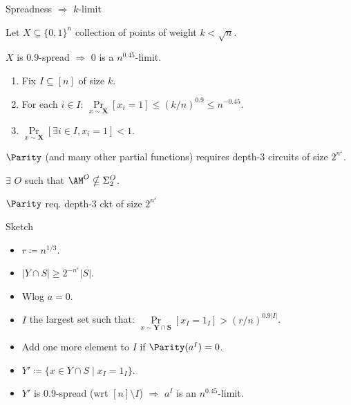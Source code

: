 \begin{frame}{Spreadness $\Rightarrow$ $k$-limit}

    Let $X \subseteq \{0, 1\}^n$ collection of points of weight $k < \sqrt{n}$.
    
    \begin{lemma}    
        $X$ is $0.9$-spread $\Rightarrow$ $0$ is a $n^{0.45}$-limit.
    \end{lemma}

    \pause

    \begin{enumerate}
        \item Fix $I \subseteq [n]$ of size $k$.
        \item For each $i \in I$: $\Pr\limits_{x \sim \mathbf{X}}[x_i = 1] \le \left( k / n \right)^{0.9}
            \le n^{-0.45}$.
            \pause
        \item $\Pr\limits_{x \sim \mathbf{X}}[\exists i \in I, x_i = 1] < 1$.
    \end{enumerate}

    \pause
    \begin{corollary}
        $\Parity$ \alert{(and many other partial functions)} requires depth-$3$ circuits of size $2^{n^{\varepsilon}}$.
    \end{corollary}

    \pause
    \begin{corollary}[Santha 89]
        \alert{$\exists$} $O$ such that $\AM^{O} \nsubseteq \Sigma_2^{O}$.
    \end{corollary}

    
\end{frame}


\begin{frame}{$\Parity$ req. depth-$3$ ckt of size $2^{n^{\varepsilon}}$}

    
    
    \pause
    \pause
\end{frame}

\begin{frame}{Sketch}

    \begin{itemize}
        \item $r \coloneqq n^{1 / 3}$.
        \item $|Y \cap S| \ge 2^{-n^{\varepsilon}} |S|$.
        \item Wlog $a = 0$.
            \pause
        \item $I$ the largest set such that: $
            \Pr\limits_{x \sim \mathbf{Y \cap S}}[x_I = 1_I] >
            (r / n)^{0.9 |I|}$.
        \item Add one more element to $I$ if $\Parity(a^I) = 0$.
            \pause
        \item $Y' \coloneqq \{ x \in Y \cap S \mid x_I = 1_I \}$.
        \item $Y'$ is $0.9$-spread (wrt $[n] \setminus I$)
            $\Rightarrow$ $a^{I}$ is an $n^{0.45}$-limit.
    \end{itemize}
\end{frame}



